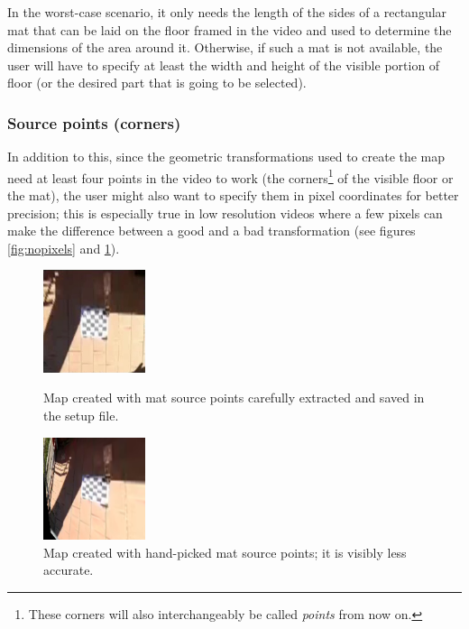 \documentclass[12pt]{article}
\begin{document}
In the worst-case scenario, it only needs the length of the sides of a rectangular mat that can be laid on the floor framed in the video and used to determine the dimensions of the area around it. Otherwise, if such a mat is not available, the user will have to specify at least the width and height of the visible portion of floor (or the desired part that is going to be selected).

\subsubsection{Source points (corners)}
\label{chap:srcpts}
In addition to this, since the geometric transformations used to create the map need at least four points in the video to work (the corners\footnote{These corners will also interchangeably be called \textit{points} from now on.} of the visible floor or the mat), the user might also want to specify them in pixel coordinates for better precision; this is especially true in low resolution videos where a few pixels can make the difference between a good and a bad transformation (see figures \ref{fig:nopixels} and \ref{fig:pixels}).

\begin{figure}[H]
  \centering
  \begin{minipage}[b]{0.45\textwidth}
    \centering
    \includegraphics[width=3cm,keepaspectratio]{img/no_pixels.jpg}
    \caption{Map created with mat source points carefully extracted and saved in the setup file.}
    \label{fig:nopixels}
  \end{minipage}
  \hfill
  \begin{minipage}[b]{0.45\textwidth}
    \centering
    \includegraphics[width=3cm,keepaspectratio]{img/pixels.png}
    \caption{Map created with hand-picked mat source points; it is visibly less accurate.}
    \label{fig:pixels}
  \end{minipage}
\end{figure}
\end{document}
